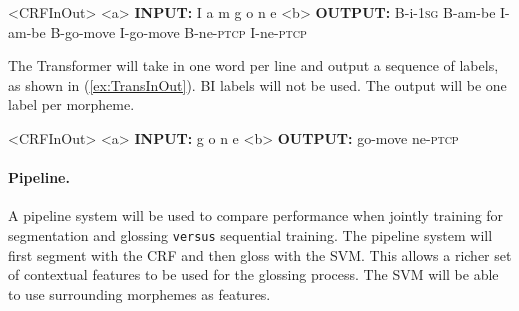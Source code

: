 \begin{singlespace}
\pex<CRFInOut>   
\label{ex:CRFInOut}
\a<a> \textbf{INPUT:} \hspace{7 mm} I \hspace{13 mm} a \hspace{14 mm} m \hspace{12 mm} g \hspace{15 mm} o \hspace{15 mm} n \hspace{15 mm} e 
\label{ex:CRFin}
\a<b> \textbf{OUTPUT:} B-i-1\textsc{sg} \hspace{1 mm} B-am-be \hspace{1 mm} I-am-be \hspace{1 mm} B-go-move \hspace{1 mm} I-go-move \hspace{1 mm} B-ne-\textsc{ptcp} \hspace{1 mm} I-ne-\textsc{ptcp}
\label{ex:CRFOut}
\xe
\end{singlespace}

The Transformer will take in one word per line and output a sequence of labels, as shown in (\ref{ex:TransInOut}). BI labels will not be used. The output will be one label per morpheme. 

\begin{singlespace}
\pex<CRFInOut>   
\label{ex:TransInOut}
\a<a> \textbf{INPUT:} \hspace{3 mm} g \hspace{2 mm} o \hspace{2 mm} n \hspace{2 mm} e 
\label{ex:Transin}
\a<b> \textbf{OUTPUT:} \hspace{3 mm} go-move \hspace{1 mm} ne-\textsc{ptcp} 
\label{ex:TransOut}
\xe
\end{singlespace}

\paragraph{Pipeline.}
A pipeline system will be used to compare performance when jointly training for segmentation and glossing {\tt versus} sequential training. 
The pipeline system will first segment with the CRF and then gloss with the SVM. This allows a richer set of contextual features to be used for the glossing process. The SVM will be able to  use surrounding morphemes as features.   

